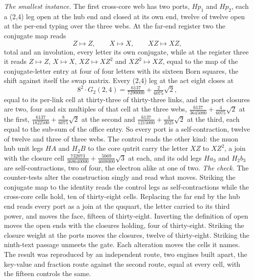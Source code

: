 \begin{chproof}
\textit{The smallest instance.} The first cross-core web has two ports, $Hp_{1}$ and $Hp_{2}$, each a (2,4) leg open at the hub end and closed at its own end, twelve of twelve open at the per-end typing over the three webs. At the far-end register two the conjugate map reads
\begin{equation} Z \mapsto Z, \qquad X \mapsto X, \qquad XZ \mapsto XZ, \end{equation}
total and an involution, every letter its own conjugate, while at the register three it reads $Z \mapsto Z$, $X \mapsto X$, $XZ \mapsto XZ^{2}$ and $XZ^{2} \mapsto XZ$, equal to the map of the conjugate-letter entry at four of four letters with its sixteen Born squares, the shift against itself the swap matrix. Every (2,4) leg at the act eight closes at
\begin{equation} 8^{2}\cdot G_{2}(2,4) = \tfrac{6137}{7290000} + \tfrac{2}{6075}\sqrt{2}, \end{equation}
equal to its per-link cell at thirty-three of thirty-three links, and the port closures are two, four and six multiples of that cell at the three webs, $\tfrac{6137}{3645000} + \tfrac{4}{6075}\sqrt{2}$ at the first, $\tfrac{6137}{1822500} + \tfrac{8}{6075}\sqrt{2}$ at the second and $\tfrac{6137}{1215000} + \tfrac{4}{2025}\sqrt{2}$ at the third, each equal to the sub-sum of the office entry. So every port is a self-contraction, twelve of twelve and three of three webs. The control reads the other kind: the muon hub unit legs $HA$ and $H_{2}B$ to the core qutrit carry the letter $XZ$ to $XZ^{2}$, a join with the closure cell $\tfrac{732073}{368640000} + \tfrac{5069}{4608000}\sqrt{3}$ at each, and its odd legs $Ha_{3}$ and $H_{2}b_{3}$ are self-contractions, two of four, the electron alike at one of two.
\textit{The check.} The counter-tests alter the construction singly and read what moves. Striking the conjugate map to the identity reads the control legs as self-contractions while the cross-core cells hold, ten of thirty-eight cells. Replacing the far end by the hub end reads every port as a join at the ququart, the letter carried to its third power, and moves the face, fifteen of thirty-eight. Inverting the definition of open moves the open ends with the closures holding, four of thirty-eight. Striking the closure weight at the ports moves the closures, twelve of thirty-eight. Striking the ninth-text passage unmeets the gate. Each alteration moves the cells it names. The result was reproduced by an independent route, two engines built apart, the key-value and fraction route against the second route, equal at every cell, with the fifteen controls the same.
\end{chproof}

